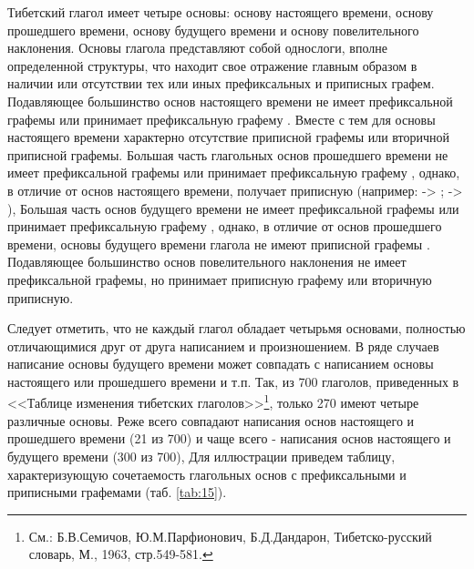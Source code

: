 Тибетский глагол имеет четыре основы: основу настоящего времени, основу прошедшего времени, основу будущего времени и основу повелительного наклонения. Основы глагола представляют собой однослоги, вполне определенной структуры, что находит свое отражение главным образом в наличии или отсутствии тех или иных префиксальных и приписных графем. Подавляющее большинство основ настоящего времени не имеет префиксальной графемы или принимает префиксальную графему . Вместе с тем для основы настоящего времени характерно отсутствие приписной графемы  или вторичной приписной графемы. Большая часть глагольных основ прошедшего времени не имеет префиксальной графемы или принимает префиксальную графему , однако, в отличие от основ настоящего времени, получает приписную  (например:  -> ;  -> ), Большая часть основ будущего времени не имеет префиксальной графемы или принимает префиксальную графему , однако, в отличие от основ прошедшего времени, основы будущего времени глагола не имеют приписной графемы . Подавляющее большинство основ повелительного наклонения не имеет префиксальной графемы, но принимает приписную графему  или вторичную приписную.

Следует отметить, что не каждый глагол обладает четырьмя основами, полностью отличающимися друг от друга написанием и произношением. В ряде случаев написание основы будущего времени может совпадать с написанием основы настоящего или прошедшего времени и т.п. Так, из 700 глаголов, приведенных в <<Таблице изменения тибетских
глаголов>>\footnote[33]{См.: Б.В.Семичов, Ю.М.Парфионович, Б.Д.Дандарон, Тибетско-русский словарь, М., 1963, стр.549-581.}, только 270 имеют четыре различные основы. Реже всего совпадают написания основ настоящего и прошедшего времени (21 из 700) и чаще всего - написания основ настоящего и будущего времени (300 из 700),
Для иллюстрации приведем таблицу, характеризующую сочетаемость глагольных основ с префиксальными и приписными графемами (таб. \ref{tab:15}).

